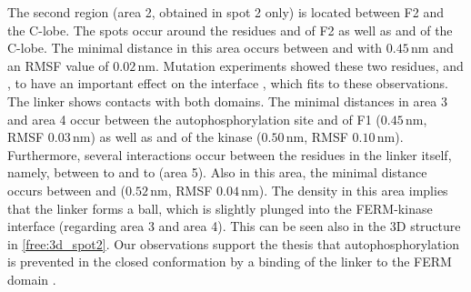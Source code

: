 The second region (area 2, obtained in spot 2 only) is located between F2 and the C-lobe. The spots occur around the residues  and  of F2 as well as  and  of the C-lobe. The minimal distance in this area occurs between  and  with $0.45\,\si{\nano\metre}$ and an RMSF value of $0.02\,\si{\nano\metre}$. Mutation experiments showed these two residues,  and , to have an important effect on the interface \autocite{structFAK}, which fits to these observations.\\
The linker shows contacts with both domains. The minimal distances in area 3 and area 4 occur between the autophosphorylation site  and  of F1 ($0.45\,\si{\nano\metre}$, RMSF $0.03\,\si{\nano\metre}$) as well as  and  of the kinase ($0.50\,\si{\nano\metre}$, RMSF $0.10\,\si{\nano\metre}$). Furthermore, several interactions occur between the residues in the linker itself, namely, between  to  and  to  (area 5). Also in this area, the minimal distance occurs between  and  ($0.52\,\si{\nano\metre}$, RMSF $0.04\,\si{\nano\metre}$). The density in this area implies that the linker forms a ball, which is slightly plunged into the FERM-kinase interface (regarding area 3 and area 4). This can be seen also in the 3D structure in \autoref{free:3d_spot2}. Our observations support the thesis that autophosphorylation is prevented in the closed conformation by a binding of the linker to the FERM domain \autocite{pap003}.\\
%
%
%
